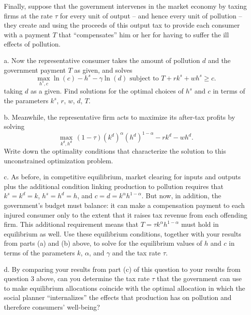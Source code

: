\documentclass[12pt]{article}
\begin{document}
Finally, suppose that the government intervenes in the market economy by taxing firms at the rate $\tau$ for every unit of output -- and hence every unit of pollution -- they create and using the proceeds of this output tax to provide each consumer with a payment $T$ that ``compensates'' him or her for having to suffer the ill effects of pollution.
\begin{description}
\item a. Now the representative consumer takes the amount of pollution $d$ and the government payment $T$ as given, and solves
$$
\max_{h^{s},c} \ln(c) - h^{s} - \gamma \ln(d) \text{ subject to } T + rk^{s} + wh^{s} \geq c.
$$
taking $d$ as a given. Find solutions for the optimal choices of $h^{s}$ and $c$ in terms of the parameters $k^{s}$, $r$, $w$, $d$, $T$.
\item b. Meanwhile, the representative firm acts to maximize its after-tax profits by solving
$$
\max_{k^{d},h^{d}} \, (1-\tau)(k^{d})^{\alpha}(h^{d})^{1-\alpha} - rk^{d} - wh^{d}.
$$
Write down the optimality conditions that characterize the solution to this unconstrained optimization problem.
\item c. As before, in competitive equilibrium, market clearing for inputs and outputs plus the additional condition linking production to pollution requires that $k^{s}=k^{d}=k$, $h^{s}=h^{d}=h$, and $c=d=k^{\alpha}h^{1-\alpha}$. But now, in addition, the government's budget must balance: it can make a compensation payment to each injured consumer only to the extent that it raises tax revenue from each offending firm. This additional requirement means that $T=\tau k^{\alpha}h^{1-\alpha}$ must hold in equilibrium as well. Use these equilibrium conditions, together with your results from parts (a) and (b) above, to solve for the equilibrium values of $h$ and $c$ in terms of the parameters $k$, $\alpha$, and $\gamma$ and the tax rate $\tau$.
\item d. By comparing your results from part (c) of this question to your results from question 3 above, can you determine the tax rate $\tau$ that the government can use to make equilibrium allocations coincide with the optimal allocation in which the social planner ``internalizes'' the effects that production has on pollution and therefore consumers' well-being?
\end{description}
\end{document}
